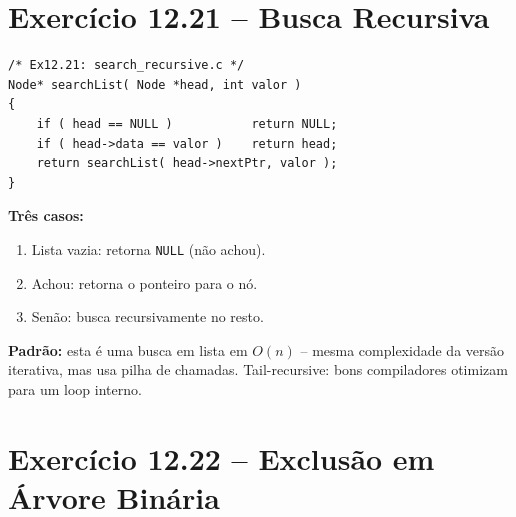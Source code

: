 \documentclass[12pt,a4paper]{article}
\begin{document}
\section{Exercício 12.21 -- Busca Recursiva}

\begin{respostabox}
\begin{lstlisting}
/* Ex12.21: search_recursive.c */
Node* searchList( Node *head, int valor )
{
    if ( head == NULL )           return NULL;
    if ( head->data == valor )    return head;
    return searchList( head->nextPtr, valor );
}
\end{lstlisting}

\textbf{Três casos:}
\begin{enumerate}[noitemsep]
  \item Lista vazia: retorna \texttt{NULL} (não achou).
  \item Achou: retorna o ponteiro para o nó.
  \item Senão: busca recursivamente no resto.
\end{enumerate}

\textbf{Padrão:} esta é uma busca em lista em $O(n)$ -- mesma complexidade da
versão iterativa, mas usa pilha de chamadas. Tail-recursive: bons compiladores
otimizam para um loop interno.
\end{respostabox}

\newpage

\section{Exercício 12.22 -- Exclusão em Árvore Binária}
\end{document}
